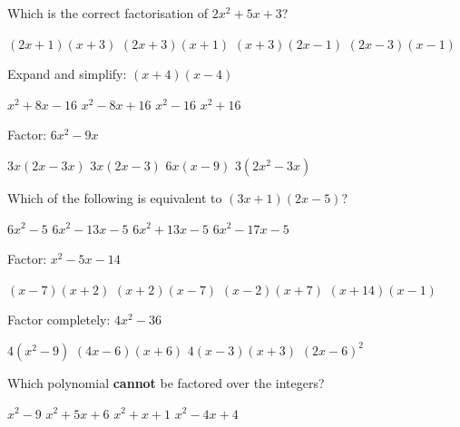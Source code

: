 \documentclass[addpoints]{exam}
\begin{document}
\begin{questions}
\question[1] Which is the correct factorisation of $2x^2 + 5x + 3$?
\begin{choices}
    \choice $(2x + 1)(x + 3)$
    \correctchoice $(2x + 3)(x + 1)$
    \choice $(x + 3)(2x - 1)$
    \choice $(2x - 3)(x - 1)$
\end{choices}
\vspace{3mm}

\question[1] Expand and simplify: $(x + 4)(x - 4)$
\begin{choices}
    \choice $x^2 + 8x - 16$
    \choice $x^2 - 8x + 16$
    \correctchoice $x^2 - 16$
    \choice $x^2 + 16$
\end{choices}
\vspace{3mm}

\question[1] Factor: $6x^2 - 9x$
\begin{choices}
    \choice $3x(2x - 3x)$
    \correctchoice $3x(2x - 3)$
    \choice $6x(x - 9)$
    \choice $3(2x^2 - 3x)$
\end{choices}
\vspace{3mm}

\question[1] Which of the following is equivalent to $(3x + 1)(2x - 5)$?
\begin{choices}
    \choice $6x^2 - 5$
    \correctchoice $6x^2 - 13x - 5$
    \choice $6x^2 + 13x - 5$
    \choice $6x^2 - 17x - 5$
\end{choices}
\vspace{3mm}

\question[1] Factor: $x^2 - 5x - 14$
\begin{choices}
    \choice $(x - 7)(x + 2)$
    \correctchoice $(x + 2)(x - 7)$
    \choice $(x - 2)(x + 7)$
    \choice $(x + 14)(x - 1)$
\end{choices}
\vspace{3mm}

\question[1] Factor completely: $4x^2 - 36$
\begin{choices}
    \choice $4(x^2 - 9)$
    \choice $(4x-6)(x+6)$
    \correctchoice $4(x-3)(x+3)$
    \choice $(2x - 6)^2$
\end{choices}
\vspace{3mm}

\question[1] Which polynomial \textbf{cannot} be factored over the integers?
\begin{choices}
    \choice $x^2 - 9$
    \choice $x^2 + 5x + 6$
    \correctchoice $x^2 + x + 1$
    \choice $x^2 - 4x + 4$
\end{choices}
\vspace{3mm}


\end{questions}
\end{document}
